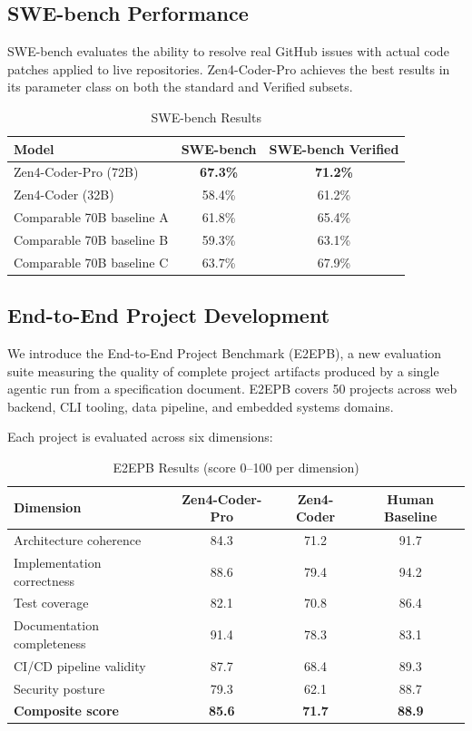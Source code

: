 \documentclass[11pt,a4paper]{article}
\begin{document}
\subsection{SWE-bench Performance}

SWE-bench \cite{swebench} evaluates the ability to resolve real GitHub issues with actual code patches applied to live repositories. Zen4-Coder-Pro achieves the best results in its parameter class on both the standard and Verified subsets.

\begin{table}[H]
\centering
\caption{SWE-bench Results}
\begin{tabular}{lcc}
\toprule
\textbf{Model} & \textbf{SWE-bench} & \textbf{SWE-bench Verified} \\
\midrule
Zen4-Coder-Pro (72B) & \textbf{67.3\%} & \textbf{71.2\%} \\
Zen4-Coder (32B) & 58.4\% & 61.2\% \\
Comparable 70B baseline A & 61.8\% & 65.4\% \\
Comparable 70B baseline B & 59.3\% & 63.1\% \\
Comparable 70B baseline C & 63.7\% & 67.9\% \\
\bottomrule
\end{tabular}
\end{table}

\subsection{End-to-End Project Development}

We introduce the End-to-End Project Benchmark (E2EPB), a new evaluation suite measuring the quality of complete project artifacts produced by a single agentic run from a specification document. E2EPB covers 50 projects across web backend, CLI tooling, data pipeline, and embedded systems domains.

Each project is evaluated across six dimensions:

\begin{table}[H]
\centering
\caption{E2EPB Results (score 0--100 per dimension)}
\begin{tabular}{lccc}
\toprule
\textbf{Dimension} & \textbf{Zen4-Coder-Pro} & \textbf{Zen4-Coder} & \textbf{Human Baseline} \\
\midrule
Architecture coherence & 84.3 & 71.2 & 91.7 \\
Implementation correctness & 88.6 & 79.4 & 94.2 \\
Test coverage & 82.1 & 70.8 & 86.4 \\
Documentation completeness & 91.4 & 78.3 & 83.1 \\
CI/CD pipeline validity & 87.7 & 68.4 & 89.3 \\
Security posture & 79.3 & 62.1 & 88.7 \\
\midrule
\textbf{Composite score} & \textbf{85.6} & \textbf{71.7} & \textbf{88.9} \\
\bottomrule
\end{tabular}
\end{table}
\end{document}
